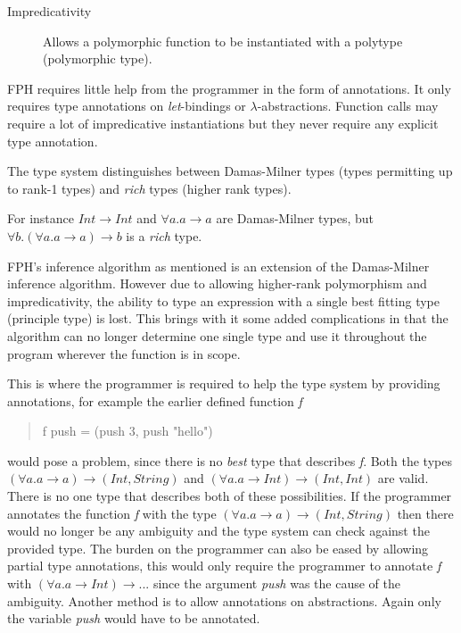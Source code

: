 \begin{description}
\item[Impredicativity] Allows a polymorphic function to be instantiated with a polytype (polymorphic type). 
\end{description}

FPH requires little help from the programmer in the form of annotations. It only requires type annotations on \textit{let}-bindings or $\lambda$-abstractions. Function calls may require a lot of impredicative instantiations but they never require any explicit type annotation.

The type system distinguishes between Damas-Milner types (types permitting up to rank-1 types) and \textit{rich} types (higher rank types).

For instance $Int \rightarrow Int$ and $\forall a. a \rightarrow a$ are Damas-Milner types, but $\forall b.(\forall a. a \rightarrow a) \rightarrow b$ is a \textit{rich} type.

FPH's inference algorithm as mentioned is an extension of the Damas-Milner inference algorithm. However due to allowing higher-rank polymorphism and impredicativity, the ability to type an expression with a single best fitting type (principle type) is lost. This brings with it some added complications in that the algorithm can no longer determine one single type and use it throughout the program wherever the function is in scope.

This is where the programmer is required to help the type system by providing annotations, for example the earlier defined function \emph{f}
\begin{quotation}
f push = (push 3, push "hello")
\end{quotation}
would pose a problem, since there is no \emph{best} type that describes \emph{f}. Both the types $(\forall a. a \rightarrow a) \rightarrow (Int, String)$ and $(\forall a. a \rightarrow Int) \rightarrow (Int, Int)$ are valid. There is no one type that describes both of these possibilities.
If the programmer annotates the function \emph{f} with the type $(\forall a. a \rightarrow a) \rightarrow (Int, String)$ then there would no longer be any ambiguity and the type system can check against the provided type.
The burden on the programmer can also be eased by allowing partial type annotations, this would only require the programmer to annotate \emph{f} with $(\forall a. a \rightarrow Int) \rightarrow ...$ since the argument \emph{push} was the cause of the ambiguity. Another method is to allow annotations on abstractions. Again only the variable \emph{push} would have to be annotated.

